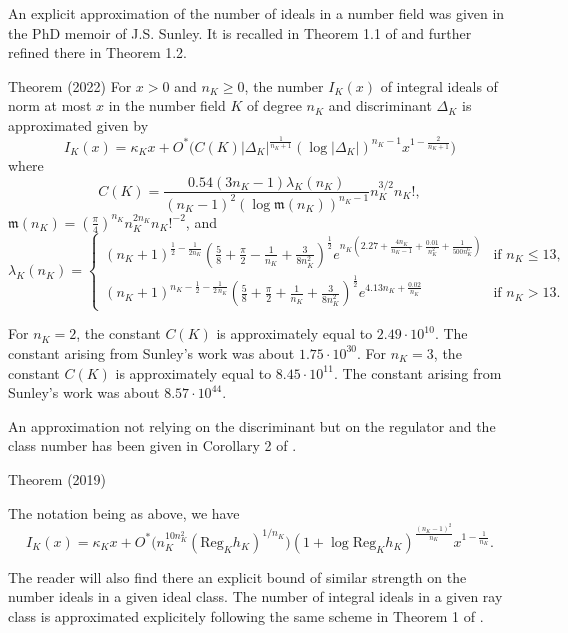 An explicit approximation of the number of ideals in a number field
was given in the PhD memoir
\cite{Sunley*73}
of J.S. Sunley. It is recalled in Theorem 1.1 of
\cite{Lee*22}
and further refined there in Theorem 1.2.
\par 
\begin{thm}{Theorem (2022)}
    For $x > 0$ and $n_K\ge 0$, the number $I_K(x)$ of integral ideals
    of norm at most $x$ in the
    number field $K$ of degree $n_K$ and discriminant $\Delta_K$ is approximated given by
    $$
    I_K(x)
    =\kappa_K x
    + O^*\biggl(C(K)|\Delta_K|^{\frac{1}{n_K+1}}(\log|\Delta_K|)^{n_K-1}
    x^{1-\frac{2}{n_K+1}}\biggr)
    $$
    where
    $$
    C(K) = \frac{0.54 (3 n_K-1) \lambda_{K}(n_K)}{(n_K-1)^2 (\log{\mathfrak{m}(n_K)})^{n_K-1}} n_K^{3/2} n_K!,
    $$
    $\mathfrak{m}(n_K) = \left(\frac{\pi}{4}\right)^{n_K} n_K^{2 n_K} n_K!^{-2}$, and
    $$
    \lambda_{K}(n_K) =
    \begin{cases}
          (n_K+1)^{\frac{1}{2} - \frac{1}{2 n_K}} \left(\frac{5}{8} + \frac{\pi}{2} - \frac{1}{n_K} + \frac{3}{8 n_K^2}\right)^{\frac{1}{2}} e^{n_K\left(2.27 + \frac{4 n_K}{n_K-1} + \frac{0.01}{n_K^2} + \frac{1}{500 n_K^6}\right)} &\text{if }n_K \leq 13, \\
          (n_K+1)^{n_K-\frac{1}{2}-\frac{1}{2\,n_K}} \left(\frac{5}{8} + \frac{\pi}{2} + \frac{1}{n_K} + \frac{3}{8 n_K^2}\right)^{\frac{1}{2}} e^{4.13 n_K + \frac{0.02}{n_K}} &\text{if }n_K > 13.
      \end{cases}
    $$
\end{thm}

For $n_K=2$, the constant $C(K)$ is approximately equal to $2.49\cdot 10^{10}$. The
constant arising from Sunley's work was about $1.75\cdot 10^{30}$. 
For $n_K=3$, the constant $C(K)$ is approximately equal to $8.45\cdot 10^{11}$. The
constant arising from Sunley's work was about $8.57\cdot 10^{44}$.

An approximation not relying on the discriminant but on the regulator
and the class number has been given in Corollary 2 of
\cite{Debaene*19}.
\par 
\begin{thm}{Theorem (2019)}


  The notation being as above, we have
  $$
  I_K(x)=\kappa_K x
  +O^*\biggl(n_K^{10n_K^2}
  (\text{Reg}_Kh_K)^{1/n_K}\biggr)
  (1+\log\text{Reg}_Kh_K)^{\frac{(n_K-1)^2}{n_K}}
  x^{1-\frac{1}{n_K}}.
  $$
\end{thm}

The reader will also find there an explicit bound of similar strength
on the number ideals in a given ideal class. 
The number of integral ideals in a given ray class is approximated
explicitely following the same scheme in Theorem 1 of
\cite{Gun-Ramare-Sivaraman*22b}.

